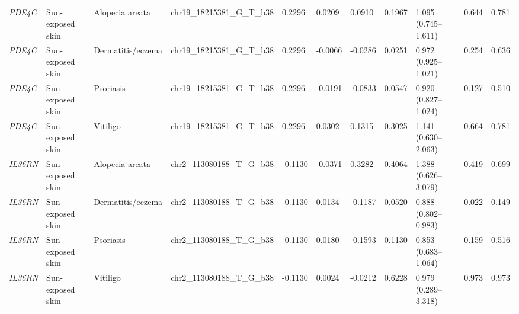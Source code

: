 \documentclass[10pt,a4paper]{article}
\begin{document}
\begin{landscape}
\begin{longtable}{p{1.5cm}p{2.7cm}p{2.5cm}p{4.2cm}p{1.5cm}p{1.5cm}p{1.5cm}p{1.4cm}p{3.4cm}p{1.8cm}p{1.8cm}}
\textit{PDE4C} & Sun-exposed skin & Alopecia areata & chr19\_18215381\_G\_T\_b38 & 0.2296 & 0.0209 & 0.0910 & 0.1967 & 1.095 (0.745--1.611) & 0.644 & 0.781 \\
\textit{PDE4C} & Sun-exposed skin & Dermatitis/eczema & chr19\_18215381\_G\_T\_b38 & 0.2296 & -0.0066 & -0.0286 & 0.0251 & 0.972 (0.925--1.021) & 0.254 & 0.636 \\
\textit{PDE4C} & Sun-exposed skin & Psoriasis & chr19\_18215381\_G\_T\_b38 & 0.2296 & -0.0191 & -0.0833 & 0.0547 & 0.920 (0.827--1.024) & 0.127 & 0.510 \\
\textit{PDE4C} & Sun-exposed skin & Vitiligo & chr19\_18215381\_G\_T\_b38 & 0.2296 & 0.0302 & 0.1315 & 0.3025 & 1.141 (0.630--2.063) & 0.664 & 0.781 \\
\textit{IL36RN} & Sun-exposed skin & Alopecia areata & chr2\_113080188\_T\_G\_b38 & -0.1130 & -0.0371 & 0.3282 & 0.4064 & 1.388 (0.626--3.079) & 0.419 & 0.699 \\
\textit{IL36RN} & Sun-exposed skin & Dermatitis/eczema & chr2\_113080188\_T\_G\_b38 & -0.1130 & 0.0134 & -0.1187 & 0.0520 & 0.888 (0.802--0.983) & 0.022 & 0.149 \\
\textit{IL36RN} & Sun-exposed skin & Psoriasis & chr2\_113080188\_T\_G\_b38 & -0.1130 & 0.0180 & -0.1593 & 0.1130 & 0.853 (0.683--1.064) & 0.159 & 0.516 \\
\textit{IL36RN} & Sun-exposed skin & Vitiligo & chr2\_113080188\_T\_G\_b38 & -0.1130 & 0.0024 & -0.0212 & 0.6228 & 0.979 (0.289--3.318) & 0.973 & 0.973 \\
\end{longtable}
\end{landscape}
\end{document}
